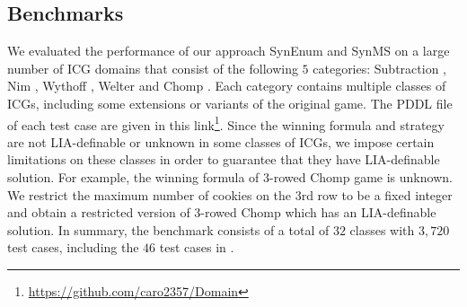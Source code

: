 \documentclass[review]{elsarticle}
\begin{document}
\subsection{Benchmarks}
We evaluated the performance of our approach SynEnum and SynMS on a large number of ICG domains that consist of the following $5$ categories: Subtraction \cite{Yag2001}, Nim \cite{Bou1901}, Wythoff \cite{Wyt1907}, Welter \cite{Wel1952} and Chomp \cite{Sch1952}.
Each category contains multiple classes of ICGs, including some extensions or variants of the original game.
The PDDL file of each test case are given in this link\footnote{\url{https://github.com/caro2357/Domain}}.
Since the winning formula and strategy are not LIA-definable or unknown in some classes of ICGs, we impose certain limitations on these classes in order to guarantee that they have LIA-definable solution.
For example, the winning formula of 3-rowed Chomp game is unknown.
We restrict the maximum number of cookies on the 3rd row to be a fixed integer and obtain a restricted version of 3-rowed Chomp which has an LIA-definable solution.
In summary, the benchmark consists of a total of $32$ classes with $3,720$ test cases, including the $46$ test cases in \cite{WuFXLQCR2020}. 
 
\end{document}

